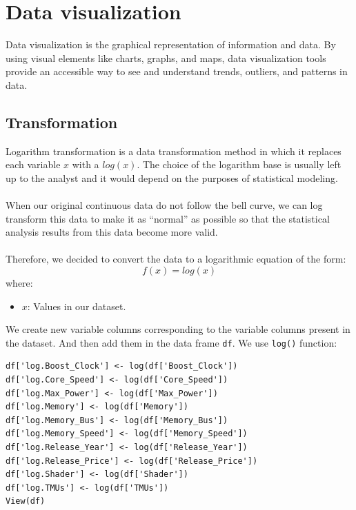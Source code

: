 \documentclass[a4paper]{article}
\begin{document}
\section{Data visualization}
Data visualization is the graphical representation of information and data. By using visual elements like charts, graphs, and maps, data visualization tools provide an accessible way to see and understand trends, outliers, and patterns in data.
\subsection{Transformation}
Logarithm transformation \cite{bib6} is a data transformation method in which it replaces each variable $x$ with a $log(x)$. The choice of the logarithm base is usually left up to the analyst and it would depend on the purposes of statistical modeling.\\\\
When our original continuous data do not follow the bell curve, we can log transform this data to make it as “normal” as possible so that the statistical analysis results from this data become more valid.\\\\
Therefore, we decided to convert the data to a logarithmic equation of the form:
\begin{equation*}
    f(x) = log(x)
\end{equation*}
where:
\begin{itemize}
    \item $x$: Values in our dataset.
\end{itemize}
We create new variable columns corresponding to the variable columns present in the dataset. And then add them in the data frame \verb|df|. We use \verb|log()| function:
\begin{mdframed}[leftline=false,rightline=false,backgroundcolor=lightblue!10,nobreak=false]
    \begin{verbatim}
df['log.Boost_Clock'] <- log(df['Boost_Clock'])
df['log.Core_Speed'] <- log(df['Core_Speed'])
df['log.Max_Power'] <- log(df['Max_Power'])
df['log.Memory'] <- log(df['Memory'])
df['log.Memory_Bus'] <- log(df['Memory_Bus'])
df['log.Memory_Speed'] <- log(df['Memory_Speed'])
df['log.Release_Year'] <- log(df['Release_Year'])
df['log.Release_Price'] <- log(df['Release_Price'])
df['log.Shader'] <- log(df['Shader'])
df['log.TMUs'] <- log(df['TMUs'])
View(df)
    \end{verbatim}
\end{mdframed}
\end{document}
